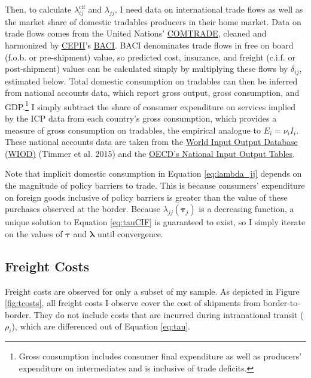 \documentclass{puthesis}
\begin{document}
Then, to calculate \(\lambda_{ij}^{\text{cif}}\) and \(\lambda_{jj}\), I
need data on international trade flows as well as the market share of
domestic tradables producers in their home market. Data on trade flows
comes from the United Nations'
\href{https://comtrade.un.org/db/default.aspx}{COMTRADE}, cleaned and
harmonized by \href{http://www.cepii.fr/CEPII/en/welcome.asp}{CEPII}'s
\href{http://www.cepii.fr/cepii/en/bdd_modele/presentation.asp?id=1}{BACI}.
BACI denominates trade flows in free on board (f.o.b. or pre-shipment)
value, so predicted cost, insurance, and freight (c.i.f. or
post-shipment) values can be calculated simply by multiplying these
flows by \(\delta_{ij}\), estimated below. Total domestic consumption on
tradables can then be inferred from national accounts data, which report
gross output, gross consumption, and GDP.\footnote{Gross consumption
  includes consumer final expenditure as well as producers' expenditure
  on intermediates and is inclusive of trade deficits.} I simply
subtract the share of consumer expenditure on services implied by the
ICP data from each country's gross consumption, which provides a measure
of gross consumption on tradables, the empirical analogue to
\(E_i = \nu_i I_i\). These national accounts data are taken from the
\href{http://www.wiod.org/home}{World Input Output Database (WIOD)}
(Timmer et al. 2015) and the
\href{https://stats.oecd.org/Index.aspx?DataSetCode=IOTS}{OECD's
National Input Output Tables}.

Note that implicit domestic consumption in Equation \ref{eq:lambda_jj}
depends on the magnitude of policy barriers to trade. This is because
consumers' expenditure on foreign goods inclusive of policy barriers is
greater than the value of these purchases observed at the border.
Because \(\lambda_{jj}(\bm{\tau}_j)\) is a decreasing function, a unique
solution to Equation \ref{eq:tauCIF} is guaranteed to exist, so I simply
iterate on the values of \(\bm{\tau}\) and \(\bm{\lambda}\) until
convergence.

\subsection{Freight Costs}

Freight costs are observed for only a subset of my sample. As depicted
in Figure \ref{fig:tcosts}, all freight costs I observe cover the cost
of shipments from border-to-border. They do not include costs that are
incurred during intranational transit (\(\rho_i\)), which are
differenced out of Equation \ref{eq:tau}.
\end{document}
